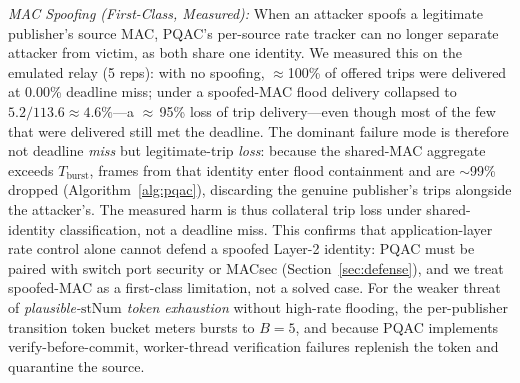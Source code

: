 \documentclass[journal]{IEEEtran}
\begin{document}
\begin{table}[t]
\centering
\caption{Multi-Source Random-MAC Flood on Emulated Relay ($\overline{S}=573\,\mu$s, 100K\,pps, 5 reps): Priority Preserves Trip Delivery}
\label{tab:multisource}
\scriptsize
{}
\end{table}

\textit{MAC Spoofing (First-Class, Measured):} When an attacker spoofs a legitimate publisher's source MAC, PQAC's per-source rate tracker can no longer separate attacker from victim, as both share one identity. We measured this on the emulated relay (5 reps): with no spoofing, $\approx$100\% of offered trips were delivered at 0.00\% deadline miss; under a spoofed-MAC flood delivery collapsed to $5.2/113.6 \approx 4.6\%$---a $\approx$\,95\% loss of trip delivery---even though most of the few that were delivered still met the deadline. The dominant failure mode is therefore not deadline \emph{miss} but legitimate-trip \emph{loss}: because the shared-MAC aggregate exceeds $T_{\text{burst}}$, frames from that identity enter flood containment and are $\sim$99\% dropped (Algorithm~\ref{alg:pqac}), discarding the genuine publisher's trips alongside the attacker's. The measured harm is thus collateral trip loss under shared-identity classification, not a deadline miss. This confirms that application-layer rate control alone cannot defend a spoofed Layer-2 identity: PQAC must be paired with switch port security or MACsec (Section~\ref{sec:defense}), and we treat spoofed-MAC as a first-class limitation, not a solved case. For the weaker threat of \emph{plausible-$\text{stNum}$ token exhaustion} without high-rate flooding, the per-publisher transition token bucket meters bursts to $B=5$, and because PQAC implements verify-before-commit, worker-thread verification failures replenish the token and quarantine the source.
\end{document}
